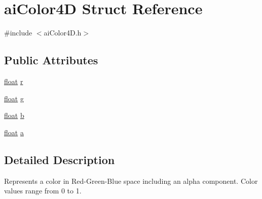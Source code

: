 \hypertarget{structai_color4_d}{\section{ai\-Color4\-D Struct Reference}
\label{structai_color4_d}
}


{\ttfamily \#include $<$ai\-Color4\-D.\-h$>$}

\subsection*{Public Attributes}
\begin{DoxyCompactItemize}
\item 
\hyperlink{fmod_8h_aeb841aa4b4b5f444b5d739d865b420af}{float} \hyperlink{structai_color4_d_a989c2117cfae5a4457fa65f0257e93c7}{r}
\item 
\hyperlink{fmod_8h_aeb841aa4b4b5f444b5d739d865b420af}{float} \hyperlink{structai_color4_d_a32e929c7db12fb6f79f74a611f6d8fe6}{g}
\item 
\hyperlink{fmod_8h_aeb841aa4b4b5f444b5d739d865b420af}{float} \hyperlink{structai_color4_d_ab64376fc730371f8952f5f98084b2430}{b}
\item 
\hyperlink{fmod_8h_aeb841aa4b4b5f444b5d739d865b420af}{float} \hyperlink{structai_color4_d_a1bf4f719c14e844dcd7ce5a1c1969c89}{a}
\end{DoxyCompactItemize}


\subsection{Detailed Description}
Represents a color in Red-\/\-Green-\/\-Blue space including an alpha component. Color values range from 0 to 1. 

